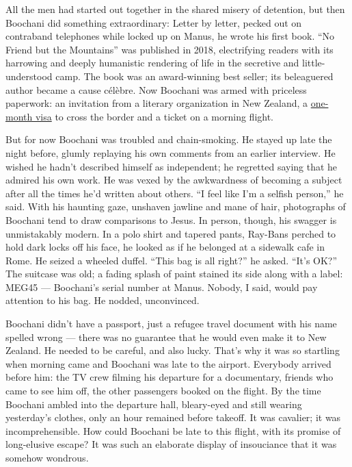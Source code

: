 All the men had started out together in the shared misery of detention,
but then Boochani did something extraordinary: Letter by letter, pecked
out on contraband telephones while locked up on Manus, he wrote his
first book. ``No Friend but the Mountains'' was published in 2018,
electrifying readers with its harrowing and deeply humanistic rendering
of life in the secretive and little-understood camp. The book was an
award-winning best seller; its beleaguered author became a cause
célèbre. Now Boochani was armed with priceless paperwork: an invitation
from a literary organization in New Zealand, a
\href{https://www.nytimes.com/2019/11/14/world/australia/behrouz-boochani-refugee.html}{one-month
visa} to cross the border and a ticket on a morning flight.

But for now Boochani was troubled and chain-smoking. He stayed up late
the night before, glumly replaying his own comments from an earlier
interview. He wished he hadn't described himself as independent; he
regretted saying that he admired his own work. He was vexed by the
awkwardness of becoming a subject after all the times he'd written about
others. ``I feel like I'm a selfish person,'' he said. With his haunting
gaze, unshaven jawline and mane of hair, photographs of Boochani tend to
draw comparisons to Jesus. In person, though, his swagger is
unmistakably modern. In a polo shirt and tapered pants, Ray-Bans perched
to hold dark locks off his face, he looked as if he belonged at a
sidewalk cafe in Rome. He seized a wheeled duffel. ``This bag is all
right?'' he asked. ``It's OK?'' The suitcase was old; a fading splash of
paint stained its side along with a label: MEG45 --- Boochani's serial
number at Manus. Nobody, I said, would pay attention to his bag. He
nodded, unconvinced.

Boochani didn't have a passport, just a refugee travel document with his
name spelled wrong --- there was no guarantee that he would even make it
to New Zealand. He needed to be careful, and also lucky. That's why it
was so startling when morning came and Boochani was late to the airport.
Everybody arrived before him: the TV crew filming his departure for a
documentary, friends who came to see him off, the other passengers
booked on the flight. By the time Boochani ambled into the departure
hall, bleary-eyed and still wearing yesterday's clothes, only an hour
remained before takeoff. It was cavalier; it was incomprehensible. How
could Boochani be late to this flight, with its promise of long-elusive
escape? It was such an elaborate display of insouciance that it was
somehow wondrous.

